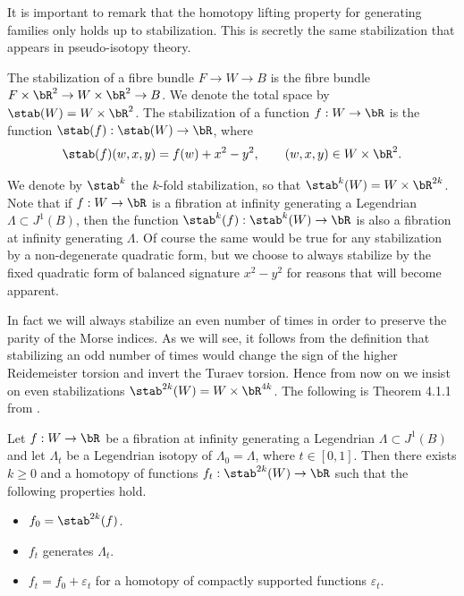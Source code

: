 It is important to remark that the homotopy lifting property for generating families only holds up to stabilization. This is secretly the same stabilization that appears in pseudo-isotopy theory.
\begin{definition}
The stabilization of a fibre bundle $F \to W \to B$ is the fibre bundle $F \times \bR^2 \to W \times \bR^2 \to B$. We denote the total space by $\stab (W)=W \times \bR^2$. The stabilization of a function $f:W \to \bR$ is the function $\stab (f): \stab (W) \to \bR$, where
\[ \stab (f)(w,x,y)=f(w)+x^2-y^2, \quad \quad (w,x,y) \in W \times \bR^2. \]
\end{definition}

We denote by $\stab ^k$ the $k$-fold stabilization, so that $\stab ^{k}(W)=W \times \bR^{2k}$. Note that if $f:W \to \bR$ is a fibration at infinity generating a Legendrian $\Lambda \subset J^1(B)$, then the function $\stab ^{k}(f): \stab ^{k}(W) \to \bR$ is also a fibration at infinity generating $\Lambda$. Of course the same would be true for any stabilization by a non-degenerate quadratic form, but we choose to always stabilize by the fixed quadratic form of balanced signature $x^2-y^2$ for reasons that will become apparent.

In fact we will always stabilize an even number of times in order to preserve the parity of the Morse indices. As we will see, it follows from the definition that stabilizing an odd number of times would change the sign of the higher Reidemeister torsion and invert the Turaev torsion. Hence from now on we insist on even stabilizations $\stab ^{2k}(W)=W \times \bR^{4k}$. The following is Theorem 4.1.1 from \cite{EG98}.

\begin{theorem}\label{Persistence Theorem}
Let $f:W \to \bR$ be a fibration at infinity generating a Legendrian $\Lambda \subset J^1(B)$ and let $ \Lambda_t $ be a Legendrian isotopy of $\Lambda_0=\Lambda$, where $t \in [0,1]$. Then there exists $k\geq0$ and a homotopy of functions $f_t: \stab ^{2k}(W) \to \bR$ such that the following properties hold.
\begin{itemize}
\item $f_0=\stab ^{2k}(f)$.
\item $f_t$ generates $\Lambda_t$.
\item $f_t=f_0+ \varepsilon_t$ for a homotopy of compactly supported functions $\varepsilon_t$.
\end{itemize}
\end{theorem}

